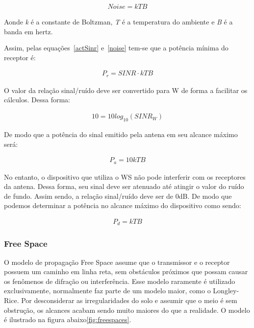 \begin{align}
  \label{noise} Noise=kTB
\end{align}

Aonde \textit{k} é a constante de Boltzman, \textit{T} é a temperatura do ambiente e \textit{B} é a banda em hertz.

Assim, pelas equações~\ref{actSinr} e~\ref{noise} tem-se que a potência mínima do receptor é:

\begin{align}
  \label{minPot} P_r= SINR \cdot  kTB
\end{align}

O valor da relação sinal/ruído deve ser convertido para W de forma a facilitar os cálculos. Dessa forma:

\begin{align}
  \label{SinrW} 10= 10 log_{10} (SINR_W)
\end{align}

De modo que a potência do sinal emitido pela antena em seu alcance máximo será:

\begin{align}
  \label{minPotAnt} P_{a}= 10kTB
\end{align}

 No entanto, o dispositivo que utiliza o WS não pode interferir com os receptores da antena. Dessa forma, seu sinal deve ser atenuado até atingir o valor do ruído de fundo. Assim sendo, a relação sinal/ruído deve ser de 0dB. De modo que podemos determinar a potência no alcance máximo do dispositivo como sendo:

\begin{align}
  \label{minPotDev} P_{d}=  kTB
\end{align}

\subsubsection{Free Space}

O modelo de propagação Free Space assume que o transmissor e o receptor possuem um caminho em linha reta, sem obstáculos próximos que possam causar os fenômenos de difração ou interferência. Esse modelo raramente é utilizado exclusivamente, normalmente faz parte de um modelo maior, como o Longley-Rice. Por desconsiderar as irregularidades do solo e assumir que o meio é sem obstrução, os alcances acabam sendo muito maiores do que a realidade. O modelo é ilustrado na figura abaixo\ref{fig:freespaces}.

